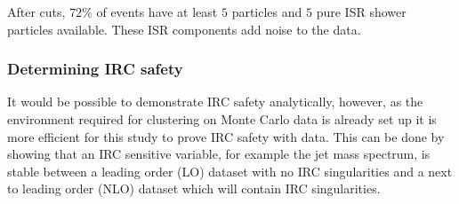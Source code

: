    After cuts, \(72\%\) of events have at least \(5\)  particles and \(5\) pure ISR shower particles available.
    These ISR components add noise to the data.

\subsubsection{Determining IRC safety}
It would be possible to demonstrate IRC safety analytically, however,
as the environment required for clustering on Monte Carlo data is already set up
it is more efficient for this study to prove IRC safety with data.
This can be done by showing that an IRC sensitive variable, for example the jet mass spectrum,
is stable between a leading order (LO) dataset with no IRC singularities and a next to leading order (NLO)
dataset which will contain IRC singularities.

